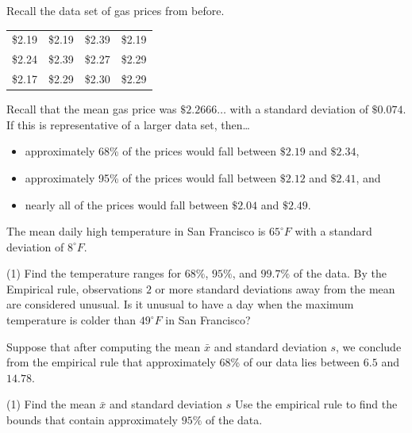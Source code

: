 \documentclass[../mathNotesPreamble]{subfiles}
\begin{document}
  \begin{ex*}
    Recall the data set of gas prices from before.
  \begin{center}
    \begin{tabular}{@{}*{4}{c}@{}}\toprule
      \$2.19 & \$2.19 & \$2.39 & \$2.19 \\
      \$2.24 & \$2.39 & \$2.27 & \$2.29 \\
      \$2.17 & \$2.29 & \$2.30 & \$2.29 \\\bottomrule
    \end{tabular}
  \end{center}
  \end{ex*}
  \noindent
  Recall that the mean gas price was $\$2.2666\dots$ with a standard deviation of $\$0.074$. If this is representative of a larger data set, then\dots
  \begin{itemize}
    \item approximately 68\% of the prices would fall between $\$2.19$ and $\$2.34$,
    \item approximately 95\% of the prices would fall between $\$2.12$ and $\$2.41$, and
    \item nearly all of the prices would fall between $\$2.04$ and $\$2.49$.
  \end{itemize}
  \pagebreak

  \begin{ex*}
    The mean daily high temperature in San Francisco is $65^\circ F$ with a standard deviation of $8^\circ F$.
    \begin{tasks}[after-item-skip=\stretch{1}, label=\textbullet](1)
      \task Find the temperature ranges for $68\%$, $95\%$, and $99.7\%$ of the data.
      \task By the Empirical rule, observations $2$ or more standard deviations away from the mean are considered unusual. Is it unusual to have a day when the maximum temperature is colder than $49^\circ F$ in San Francisco?
    \end{tasks}
  \end{ex*}
  \pagebreak

  \begin{ex*}
    Suppose that after computing the mean $\bar{x}$ and standard deviation $s$, we conclude from the empirical rule that approximately 68\% of our data lies between $6.5$ and $14.78$.
    \begin{tasks}[after-item-skip=\stretch{1}, label=\textbullet](1)
      \task Find the mean $\bar{x}$ and standard deviation $s$
      \task Use the empirical rule to find the bounds that contain approximately $95\%$ of the data.
    \end{tasks}
  \end{ex*}
  \pagebreak
\end{document}
